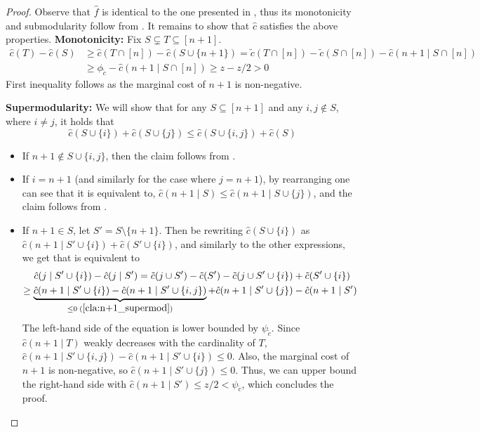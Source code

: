 \documentclass[11pt]{article}
\newcommand{\tc}{\tilde{c}}
\newcommand{\hf}{\hat{f}}
\newcommand{\hc}{\hat{c}}
\begin{document}
\begin{proof}
Observe that $\hf$ is identical to the one presented in , thus its monotonicity and submodularity follow from . It remains to show that $\hc$ satisfies the above properties.
    \textbf{Monotonicity:} 
    Fix $S \subsetneq T \subseteq [n+1]$. 
    \begin{align*}
            \hc(T) - \hc(S) 
            &\ge \hc(T \cap [n]) - \hc(S \cup \{n+1\}) 
            = \tc(T\cap [n]) - \tc(S\cap [n]) - \hc(n+1\mid S\cap[n]) \\
            &\ge \phi_{\tc} - \hc(n+1\mid S\cap[n]) 
            \ge z - z/2 
            > 0
    \end{align*}
    First inequality follows as the marginal cost of $n+1$ is non-negative.
    
    \textbf{Supermodularity:} 
    We will show that for any $S \subseteq [n+1]$ and any $i,j \notin S$, where $i \ne j$, it holds that 
    \begin{equation}\label{eq:tcSupMod}
        \hc(S \cup \{i\}) + \hc(S \cup \{j\}) \le \hc(S \cup \{i,j\}) + \hc(S)  
    \end{equation}

    \begin{itemize}
    \setlength\itemsep{-0.25em}
    \item If $n+1 \notin S \cup \{i,j\}$, then the claim follows from .

    \item If $i=n+1$ (and similarly for the case where $j=n+1$), by rearranging  one can see that it is equivalent to,
    $\hc(n+1 \mid S) \le \hc(n+1 \mid S \cup \{j\})$, and the claim follows from .

    \item If $n+1 \in S$, let $S' = S \setminus \{n+1\}$. 
    Then be rewriting $\hc(S \cup \{i\})$ as $\hc(n+1 \mid S' \cup \{i\}) + \hc(S'\cup\{i\})$, and similarly to the other expressions, we get that 
     is equivalent to
    \begin{align*}
    \hc(j \mid S' \cup \{i\}) - \hc(j \mid S') 
    = \tc(j \cup S') - \tc(S')
    - \tc(j \cup S' \cup \{i\}) &+ \tc(S' \cup \{i\}) \\
    \ge 
    \underbrace{\hc(n+1 \mid S' \cup \{i\})-\hc(n+1 \mid S'\cup\{i,j\})}_{\le 0 \;(\Cref{cla:n+1_supermod})} +\hc(n+1 \mid S' \cup \{j\}) &-
    \hc(n+1 \mid S')
    \end{align*}
    The left-hand side of the equation is lower bounded by $\psi_{\tc}$. 
    Since $\hc(n+1 \mid T)$ weakly decreases with the cardinality of $T$, $\hc(n+1 \mid S'\cup\{i,j\}) - \hc(n+1 \mid S' \cup \{i\}) \le 0$. Also, the marginal cost of $n+1$ is non-negative, so $\hc(n+1 \mid S' \cup \{j\}) \le 0$. Thus, we can upper bound the right-hand side with
    $\hc(n+1 \mid S') \le z/2 < \psi_{\tc}$, which concludes the proof.
    \end{itemize}
\end{proof}
\end{document}
